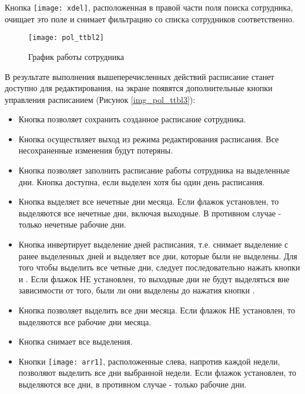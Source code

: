 \begin{prim}
Кнопка \texttt{[image: xdel]}, расположенная в правой части поля поиска сотрудника, очищает это поле и снимает фильтрацию со списка сотрудников соответственно.
\end{prim}

\begin{figure}[ht]\centering
 \texttt{[image: pol\_ttbl2]}
 \caption{График работы сотрудника}
 \label{img_pol_ttbl2}
\end{figure}

В результате выполнения вышеперечисленных действий расписание станет доступно для редактирования, на экране появятся дополнительные кнопки управления расписанием (Рисунок \ref{img_pol_ttbl3}):
\begin{itemize}
 \item Кнопка  позволяет сохранить созданное расписание сотрудника.
 \item Кнопка  осуществляет выход из режима редактирования расписания. Все несохраненные изменения будут потеряны.
 \item Кнопка  позволяет заполнить расписание работы сотрудника на выделенные дни. Кнопка доступна, если выделен хотя бы один день расписания.
 \item Кнопка  выделяет все нечетные дни месяца. Если флажок  установлен, то выделяются все нечетные дни, включая выходные. В противном случае - только нечетные рабочие дни.
 \item Кнопка  инвертирует выделение дней расписания, т.е. снимает выделение с ранее выделенных дней и выделяет все дни, которые были не выделены. Для того чтобы выделить все четные дни, следует последовательно нажать кнопки  и . Если флажок  НЕ установлен, то выходные дни не будут выделяться вне зависимости от того, были ли они выделены до нажатия кнопки .
 \item Кнопка  позволяет выделить все дни месяца. Если флажок  НЕ установлен, то выделяются все рабочие дни месяца.
 \item Кнопка  снимает все выделения.
 \item Кнопки \texttt{[image: arr1]}, расположенные слева, напротив каждой недели,   позволяют выделить все дни выбранной недели. Если флажок  установлен, то выделяются все дни, в противном случае - только рабочие дни.
\end{itemize}

